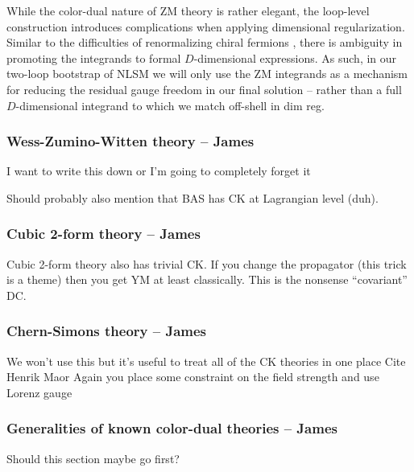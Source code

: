 \documentclass[11pt,letter]{article}
\begin{document}
While the color-dual nature of ZM theory is rather elegant, the loop-level construction introduces complications when applying dimensional regularization. Similar to the difficulties of renormalizing chiral fermions \cite{ 'tHooft}, there is ambiguity in promoting the integrands to formal $D$-dimensional expressions. As such, in our two-loop bootstrap of NLSM we will only use the ZM integrands as a mechanism for reducing the residual gauge freedom in our final solution -- rather than a full $D$-dimensional integrand to which we match off-shell in dim reg. 

\subsubsection{Wess-Zumino-Witten theory -- James}
I want to write this down or I'm going to completely forget it

Should probably also mention that BAS has CK at Lagrangian level (duh).

\subsubsection{Cubic 2-form theory -- James}

Cubic 2-form theory also has trivial CK.
If you change the propagator (this trick is a theme) then you get YM at least classically.
This is the nonsense ``covariant'' DC.

\subsubsection{Chern-Simons theory -- James}
We won't use this but it's useful to treat all of the CK theories in one place
Cite Henrik Maor
Again you place some constraint on the field strength and use Lorenz gauge

\subsubsection{Generalities of known color-dual theories -- James}
Should this section maybe go first?
\end{document}
